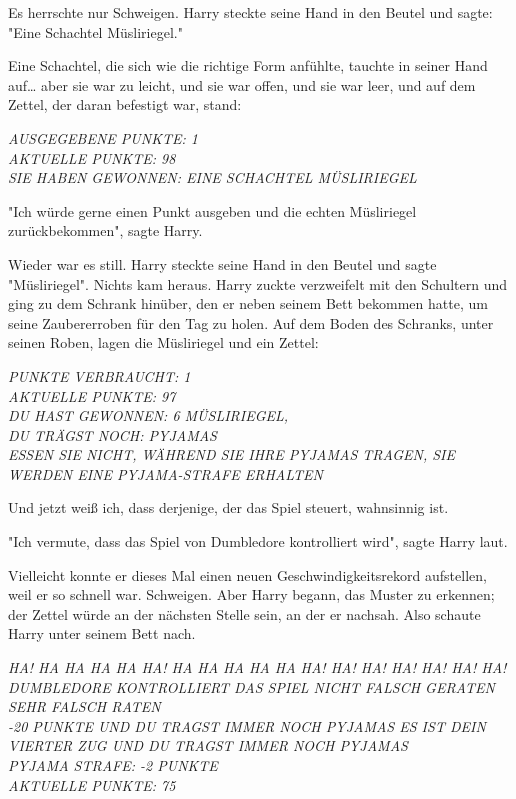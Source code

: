 {Es herrschte nur Schweigen. Harry steckte seine Hand in den Beutel und sagte: "Eine Schachtel Müsliriegel."

Eine Schachtel, die sich wie die richtige Form anfühlte, tauchte in seiner Hand auf… aber sie war zu leicht, und sie war offen, und sie war leer, und auf dem Zettel, der daran befestigt war, stand:

\emph{AUSGEGEBENE PUNKTE: 1}\\ \emph{AKTUELLE PUNKTE: 98}\\ \emph{SIE HABEN GEWONNEN: EINE SCHACHTEL MÜSLIRIEGEL}

"Ich würde gerne einen Punkt ausgeben und die echten Müsliriegel zurückbekommen", sagte Harry.

Wieder war es still. Harry steckte seine Hand in den Beutel und sagte "Müsliriegel". Nichts kam heraus. Harry zuckte verzweifelt mit den Schultern und ging zu dem Schrank hinüber, den er neben seinem Bett bekommen hatte, um seine Zaubererroben für den Tag zu holen. Auf dem Boden des Schranks, unter seinen Roben, lagen die Müsliriegel und ein Zettel:

\emph{PUNKTE VERBRAUCHT: 1}\\ \emph{AKTUELLE PUNKTE: 97}\\ \emph{DU HAST GEWONNEN: 6 MÜSLIRIEGEL,}\\ \emph{DU TRÄGST NOCH: PYJAMAS}\\ \emph{ESSEN SIE NICHT, WÄHREND SIE IHRE PYJAMAS TRAGEN, SIE WERDEN EINE PYJAMA-STRAFE ERHALTEN}

Und jetzt weiß ich, dass derjenige, der das Spiel steuert, wahnsinnig ist.

"Ich vermute, dass das Spiel von Dumbledore kontrolliert wird", sagte Harry laut.

Vielleicht konnte er dieses Mal einen neuen Geschwindigkeitsrekord aufstellen, weil er so schnell war. Schweigen. Aber Harry begann, das Muster zu erkennen; der Zettel würde an der nächsten Stelle sein, an der er nachsah. Also schaute Harry unter seinem Bett nach.

\emph{HA! HA HA HA HA HA! HA HA HA HA HA HA! HA! HA! HA! HA! HA! HA! DUMBLEDORE KONTROLLIERT DAS SPIEL NICHT FALSCH GERATEN SEHR FALSCH RATEN}\\ \emph{-20 PUNKTE UND DU TRAGST IMMER NOCH PYJAMAS ES IST DEIN VIERTER ZUG UND DU TRAGST IMMER NOCH PYJAMAS}\\ \emph{PYJAMA STRAFE: -2 PUNKTE}\\ \emph{AKTUELLE PUNKTE: 75}

}

